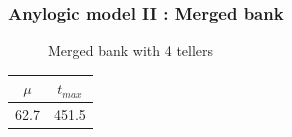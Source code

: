 \documentclass[10pt]{beamer}
\begin{document}
\begin{frame}
  \frametitle{Anylogic model II : Merged bank}
  \begin{figure}
  \centering
{}

\caption{Merged bank with 4 tellers}
\end{figure}
  
  
\begin{table}
\centering
\begin{tabular}{|c|c|}
\hline
$\mu$ & $t_{max}$ \\
\hline
62.7 & 451.5 \\
\hline
\end{tabular} 
\end{table}

\end{frame}
\end{document}
